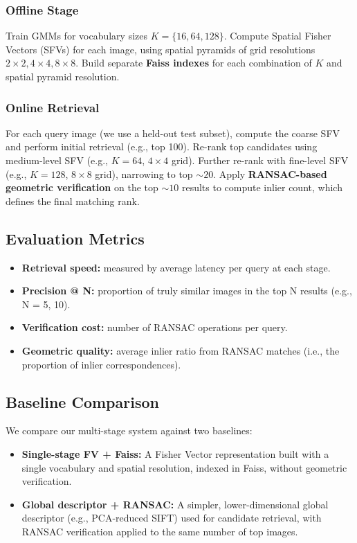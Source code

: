 \documentclass[conference]{IEEEtran}
\begin{document}
\subsubsection{Offline Stage}
Train GMMs for vocabulary sizes $K=\{16, 64, 128\}$.
Compute Spatial Fisher Vectors (SFVs) for each image, using spatial pyramids of grid resolutions $2\times2, 4\times4, 8\times8$.
Build separate \textbf{Faiss indexes} for each combination of $K$ and spatial pyramid resolution.

\subsubsection{Online Retrieval}
For each query image (we use a held-out test subset), compute the coarse SFV and perform initial retrieval (e.g., top 100).
Re-rank top candidates using medium-level SFV (e.g., $K=64$, $4\times4$ grid).
Further re-rank with fine-level SFV (e.g., $K=128$, $8\times8$ grid), narrowing to top $\sim20$.
Apply \textbf{RANSAC-based geometric verification} on the top $\sim10$ results to compute inlier count, which defines the final matching rank.

\subsection{Evaluation Metrics}
\begin{itemize}
    \item \textbf{Retrieval speed:} measured by average latency per query at each stage.
    \item \textbf{Precision @ N:} proportion of truly similar images in the top N results (e.g., N = 5, 10).
    \item \textbf{Verification cost:} number of RANSAC operations per query.
    \item \textbf{Geometric quality:} average inlier ratio from RANSAC matches (i.e., the proportion of inlier correspondences).
\end{itemize}

\subsection{Baseline Comparison}
We compare our multi-stage system against two baselines:
\begin{itemize}
    \item \textbf{Single-stage FV + Faiss:} A Fisher Vector representation built with a single vocabulary and spatial resolution, indexed in Faiss, without geometric verification.
    \item \textbf{Global descriptor + RANSAC:} A simpler, lower-dimensional global descriptor (e.g., PCA-reduced SIFT) used for candidate retrieval, with RANSAC verification applied to the same number of top images.
\end{itemize}
\end{document}

